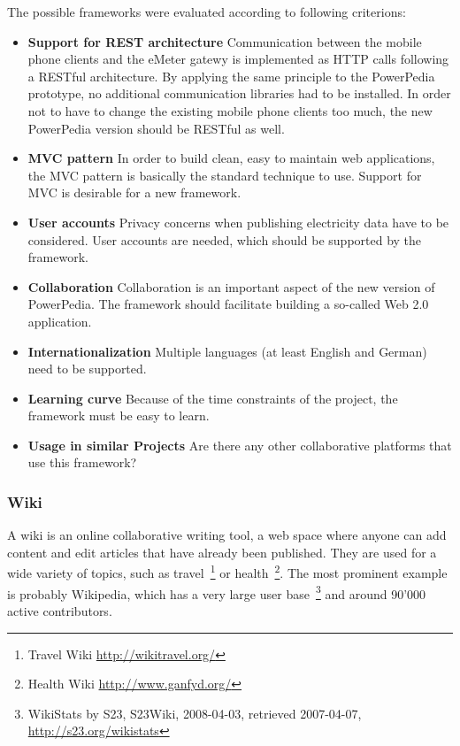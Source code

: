 The possible frameworks were evaluated according to following criterions:
\begin{itemize}
 \item \textbf{Support for REST architecture} Communication between the mobile phone clients and the eMeter gatewy is implemented as HTTP calls following a RESTful architecture. By applying the same principle to the PowerPedia prototype, no additional communication libraries had to be installed. In order not to have to change the existing mobile phone clients too much, the new PowerPedia version should be RESTful as well.
 \item \textbf{MVC pattern} In order to build clean, easy to maintain web applications, the MVC pattern is basically the standard technique to use. Support for MVC is desirable for a new framework. 
 \item \textbf{User accounts} Privacy concerns when publishing electricity data have to be considered. User accounts are needed, which should be supported by the framework.
 \item \textbf{Collaboration} Collaboration is an important aspect of the new version of PowerPedia. The framework should facilitate building a so-called Web 2.0 application.
 \item \textbf{Internationalization} Multiple languages (at least English and German) need to be supported.
 \item \textbf{Learning curve} Because of the time constraints of the project, the framework must be easy to learn.  
 \item \textbf{Usage in similar Projects} Are there any other collaborative platforms that use this framework?
\end{itemize}

\subsubsection{Wiki}
A wiki is an online collaborative writing tool, a web space where anyone can add content and edit articles that have already been published\cite{wikis_collaboration}. 
They are used for a wide variety of topics, such as travel~\footnote{Travel Wiki \url{http://wikitravel.org/}} or health~\footnote{Health Wiki \url{http://www.ganfyd.org/}}. The most prominent example is probably Wikipedia, which has a very large user base~\footnote{WikiStats by S23, S23Wiki, 2008-04-03, retrieved 2007-04-07, \url{http://s23.org/wikistats}} and around 90'000 active contributors.

